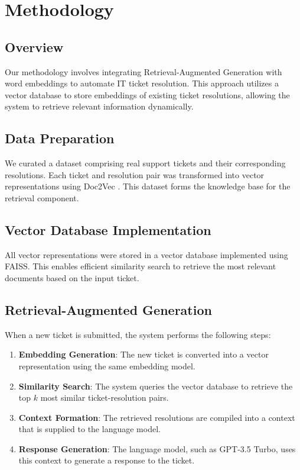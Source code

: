 \documentclass[11pt]{article}
\begin{document}
\section{Methodology}
\subsection{Overview}
Our methodology involves integrating Retrieval-Augmented Generation with word embeddings to automate IT ticket resolution. This approach utilizes a vector database to store embeddings of existing ticket resolutions, allowing the system to retrieve relevant information dynamically.

\subsection{Data Preparation}
We curated a dataset comprising real support tickets and their corresponding resolutions. Each ticket and resolution pair was transformed into vector representations using Doc2Vec \cite{li2019leveraging}. This dataset forms the knowledge base for the retrieval component.

\subsection{Vector Database Implementation}
All vector representations were stored in a vector database implemented using FAISS. This enables efficient similarity search to retrieve the most relevant documents based on the input ticket.

\subsection{Retrieval-Augmented Generation}
When a new ticket is submitted, the system performs the following steps:

\begin{enumerate}
    \item \textbf{Embedding Generation}: The new ticket is converted into a vector representation using the same embedding model.
    \item \textbf{Similarity Search}: The system queries the vector database to retrieve the top $k$ most similar ticket-resolution pairs.
    \item \textbf{Context Formation}: The retrieved resolutions are compiled into a context that is supplied to the language model.
    \item \textbf{Response Generation}: The language model, such as GPT-3.5 Turbo, uses this context to generate a response to the ticket.
\end{enumerate}
\end{document}
